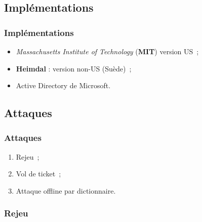 \documentclass[svgnames]{beamer}
\begin{document}
\subsection{Implémentations}

\begin{frame}
  \frametitle{Implémentations}
  
  \begin{itemize}
   \item \textit{Massachusetts Institute of Technology} (\textbf{MIT}) version US~; %
   \item \textbf{Heimdal} : version non-US (Suède)~; %
   \item Active Directory de Microsoft.
  \end{itemize}
\end{frame}


\subsection{Attaques}

\begin{frame}
 \frametitle{Attaques}
 
 \begin{enumerate}
  \item Rejeu~;
  \item Vol de ticket~;
  \item Attaque offline par dictionnaire.
 \end{enumerate}

\end{frame}

\begin{frame}
 \frametitle{Rejeu}
 
\end{frame}
\end{document}
